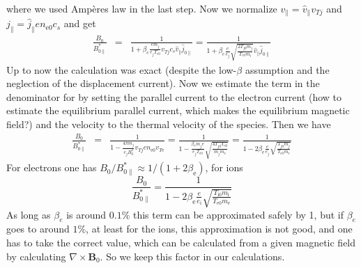 where we used Amp\`eres law in the last step.
Now we normalize $v_\|=\hat{v}_\|v_{Tj}$ and $j_\|=\hat{j}_\|
en_{\mathrm{e}0}c_s$ and get
\begin{eqnarray*}
  \frac{B_0}{B_{0\|}^*} &=&
  \frac{1}{1+\beta_e\frac{em_j}{e_jT_{e0}} v_{Tj}c_s \hat{v}_\|\hat{j}_{0\|}}
  =\frac{1}{1+\beta_e\frac{e}{e_j} \sqrt{\frac{2T_{j0}m_j}{T_{e0}m_i}} \hat{v}_\|\hat{j}_{0\|}}
\end{eqnarray*}
Up to now the calculation was exact (despite the low-$\beta$
assumption and the neglection of the displacement current). Now we
estimate the term in the denominator for by setting the  parallel current
to the electron current (how to estimate the equilibrium parallel
current, which makes the equilibrium magnetic field?) and the velocity
to the thermal velocity of the species. Then we have
\begin{eqnarray*}
  \frac{B_0}{B_{0\|}^*} &=& \frac{1}{1-\frac{4\pi m_j}{e_jB_0^2}
    v_{Tj} en_{\mathrm{e}0} v_{T\mathrm{e}}}
  =\frac{1}{1-\frac{\beta_\mathrm{e} m_j e}{e_jT_{\mathrm{e}0}}
    \sqrt{\frac{4T_{j0}T_{\mathrm{e}0}}{m_jm_\mathrm{e}}}}
  =\frac{1}{1-2\beta_\mathrm{e} \frac{e}{e_j}
    \sqrt{\frac{T_{j0}m_j}{T_{\mathrm{e}0} m_\mathrm{e}}}}
\end{eqnarray*}
For electrons one has $B_0/B_{0\|}^*\approx 1/(1+2\beta_\mathrm{e})$,
for ions 
\begin{displaymath}
  \frac{B_0}{B_{0\|}^*} =\frac{1}{1-2\beta_\mathrm{e} \frac{e}{e_\mathrm{i}}
    \sqrt{\frac{T_{\mathrm{i}0}m_\mathrm{i}}{T_{\mathrm{e}0} m_\mathrm{e}}}}
\end{displaymath}
As long as $\beta_e$ is around $0.1\%$ this term can be approximated
safely by 1, but if $\beta_e$ goes to around $1\%$, at least for the
ions, this approximation is not good, and one has to take the correct
value, which can be calculated from a given magnetic field by
calculating $\nabla\times\mathbf{B}_0$. So we keep this factor in our
calculations.

